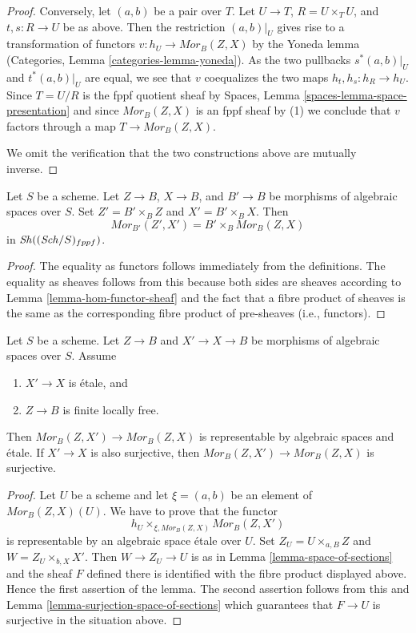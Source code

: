 \begin{proof}
\medskip\noindent
Conversely, let $(a, b)$ be a pair over $T$.
Let $U \to T$, $R = U \times_T U$, and $t, s : R \to U$ be as
above. Then the restriction $(a, b)|_U$ gives rise to a
transformation of functors $v : h_U \to \mathit{Mor}_B(Z, X)$ by the
Yoneda lemma
(Categories, Lemma \ref{categories-lemma-yoneda}).
As the two pullbacks $s^*(a, b)|_U$ and $t^*(a, b)|_U$
are equal, we see that $v$ coequalizes the two maps
$h_t, h_s : h_R \to h_U$. Since $T = U/R$ is the fppf quotient sheaf by
Spaces, Lemma \ref{spaces-lemma-space-presentation}
and since $\mathit{Mor}_B(Z, X)$ is an fppf sheaf by (1) we conclude
that $v$ factors through a map $T \to \mathit{Mor}_B(Z, X)$.

\medskip\noindent
We omit the verification that the two constructions above are mutually
inverse.
\end{proof}

\begin{lemma}
\label{lemma-base-change-hom-functor}
Let $S$ be a scheme. Let $Z \to B$, $X \to B$, and $B' \to B$
be morphisms of algebraic spaces over $S$. Set $Z' = B' \times_B Z$
and $X' = B' \times_B X$. Then
$$
\mathit{Mor}_{B'}(Z', X')
=
B' \times_B \mathit{Mor}_B(Z, X)
$$
in $\mathop{\mathit{Sh}}\nolimits((\mathit{Sch}/S)_{fppf})$.
\end{lemma}

\begin{proof}
The equality as functors follows immediately from the definitions.
The equality as sheaves follows from this because both sides are
sheaves according to
Lemma \ref{lemma-hom-functor-sheaf}
and the fact that a fibre product of sheaves is the same as the
corresponding fibre product of pre-sheaves (i.e., functors).
\end{proof}

\begin{lemma}
\label{lemma-etale-covering-hom-functor}
Let $S$ be a scheme. Let $Z \to B$ and $X' \to X \to B$ be morphisms of
algebraic spaces over $S$. Assume
\begin{enumerate}
\item $X' \to X$ is \'etale, and
\item $Z \to B$ is finite locally free.
\end{enumerate}
Then $\mathit{Mor}_B(Z, X') \to \mathit{Mor}_B(Z, X)$ is representable
by algebraic spaces and \'etale. If $X' \to X$ is also surjective,
then $\mathit{Mor}_B(Z, X') \to \mathit{Mor}_B(Z, X)$ is surjective.
\end{lemma}

\begin{proof}
Let $U$ be a scheme and let $\xi = (a, b)$ be an element of
$\mathit{Mor}_B(Z, X)(U)$. We have to prove that the functor
$$
h_U \times_{\xi, \mathit{Mor}_B(Z, X)} \mathit{Mor}_B(Z, X')
$$
is representable by an algebraic space \'etale over $U$. Set
$Z_U = U \times_{a, B} Z$ and $W = Z_U \times_{b, X} X'$.
Then $W \to Z_U \to U$ is as in
Lemma \ref{lemma-space-of-sections}
and the sheaf $F$ defined there is identified with the fibre product
displayed above. Hence the first assertion of the lemma.
The second assertion follows from this and
Lemma \ref{lemma-surjection-space-of-sections}
which guarantees that $F \to U$ is surjective in the situation above.
\end{proof}

